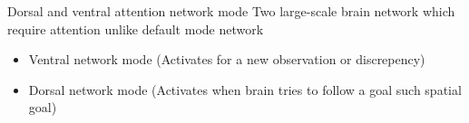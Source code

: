 \begin{frame}{Dorsal and ventral attention network mode}
    Two large-scale brain network which require attention unlike default mode network
    \begin{itemize}
        \item Ventral network mode (Activates for a new observation or discrepency) \cite{scalf-2014-trial-history-effects-in-the-ventral-attentional-network}
        \item Dorsal network mode (Activates when brain tries to follow a goal such spatial goal) \cite{vossel-2014-dorsal-and-ventral-attention-systems, corbetta-2002-control-of-goal-directed-and-stimulus-driven-attention-in-the-brain}
    \end{itemize}
\end{frame}